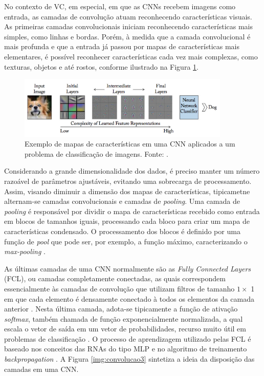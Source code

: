 No contexto de VC, em especial, em que as CNNs recebem imagens como entrada, as camadas de convolução atuam reconhecendo características visuais. As primeiras camadas convolucionais iniciam reconhecendo características mais simples, como linhas e bordas. Porém, à medida que a camada convolucional é mais profunda e que a entrada já passou por mapas de características mais elementares, é possível reconhecer características cada vez mais complexas, como texturas, objetos e até rostos, conforme ilustrado na Figura \ref{img:convolucao2}.

\begin{figure}[!ht]
	\centering
  \caption{Exemplo de mapas de características em uma CNN aplicados a um problema de classificação de imagens. Fonte: \cite{ref:khan}.}   \label{img:convolucao2}
	\includegraphics[width=0.9\textwidth]{./img/convolutions}
\end{figure}


Considerando a grande dimensionalidade dos dados, é preciso manter um número razoável de parâmetros ajustáveis, evitando uma sobrecarga de processamento. Assim, visando diminuir a dimensão dos mapas de características, tipicametne alternam-se camadas convolucionais e camadas de \textit{pooling}. Uma camada de \textit{pooling} é responsável por dividir o mapa de características recebido como entrada em blocos de tamanhos iguais, processando cada bloco para criar um mapa de características condensado. O processamento dos blocos é definido por uma função de \textit{pool} que pode ser, por exemplo, a função máximo, caracterizando o \emph{max-pooling} \cite{ref:buduma,ref:khan}.

As últimas camadas de uma CNN normalmente são as \textit{Fully Connected Layers} (FCL), ou camadas completamente conectadas, as quais correspondem essencialmente às camadas de convolução que utilizam filtros de tamanho $1 \times$ 1 em que cada elemento é densamente conectado à todos os elementos da camada anterior \cite{ref:khan}. Nesta última camada, adota-se tipicamente a função de ativação \textit{softmax}, também chamada de função exponencialmente normalizada, a qual escala o vetor de saída em um vetor de probabilidades, recurso muito útil em problemas de classificação  \cite{ref:JAI-2017}. O processo de aprendizagem utilizado pelas FCL é baseado nos conceitos das RNAs do tipo MLP e no algoritmo de treinamento \textit{backpropagation} \cite{ref:gulli, ref:khan}. A Figura \ref{img:convolucao3} sintetiza a ideia da disposição das camadas em uma CNN.

